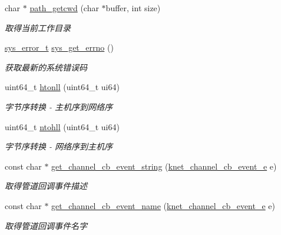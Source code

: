 \begin{DoxyCompactItemize}
char $\ast$ \hyperlink{a00084_a6c98a04f00772c05a1f51afc185f7513_a6c98a04f00772c05a1f51afc185f7513}{path\+\_\+getcwd} (char $\ast$buffer, int size)
\begin{DoxyCompactList}\small\item\em 取得当前工作目录 \end{DoxyCompactList}\item 
\hyperlink{a00053_aeaea39e7ef5adeec1efaee3eee6b12ff_aeaea39e7ef5adeec1efaee3eee6b12ff}{sys\+\_\+error\+\_\+t} \hyperlink{a00084_a2e3ede072c59452900afcb1334611dac_a2e3ede072c59452900afcb1334611dac}{sys\+\_\+get\+\_\+errno} ()
\begin{DoxyCompactList}\small\item\em 获取最新的系统错误码 \end{DoxyCompactList}\item 
uint64\+\_\+t \hyperlink{a00084_ab1f59aa518d342661072356abbbb5e85_ab1f59aa518d342661072356abbbb5e85}{htonll} (uint64\+\_\+t ui64)
\begin{DoxyCompactList}\small\item\em 字节序转换 -\/ 主机序到网络序 \end{DoxyCompactList}\item 
uint64\+\_\+t \hyperlink{a00084_aebdeac120dd80e9450e54e6f18151f45_aebdeac120dd80e9450e54e6f18151f45}{ntohll} (uint64\+\_\+t ui64)
\begin{DoxyCompactList}\small\item\em 字节序转换 -\/ 网络序到主机序 \end{DoxyCompactList}\item 
const char $\ast$ \hyperlink{a00084_aaa5f51532b5e8589a2af4a949dfcb46b_aaa5f51532b5e8589a2af4a949dfcb46b}{get\+\_\+channel\+\_\+cb\+\_\+event\+\_\+string} (\hyperlink{a00053_a2fd2faf971268f5b682ab375c455f7c9_a2fd2faf971268f5b682ab375c455f7c9}{knet\+\_\+channel\+\_\+cb\+\_\+event\+\_\+e} e)
\begin{DoxyCompactList}\small\item\em 取得管道回调事件描述 \end{DoxyCompactList}\item 
const char $\ast$ \hyperlink{a00084_a3c666a6bdd27f2bdb2202ffd4fb8899e_a3c666a6bdd27f2bdb2202ffd4fb8899e}{get\+\_\+channel\+\_\+cb\+\_\+event\+\_\+name} (\hyperlink{a00053_a2fd2faf971268f5b682ab375c455f7c9_a2fd2faf971268f5b682ab375c455f7c9}{knet\+\_\+channel\+\_\+cb\+\_\+event\+\_\+e} e)
\begin{DoxyCompactList}\small\item\em 取得管道回调事件名字 \end{DoxyCompactList}\item 

\end{DoxyCompactItemize}
